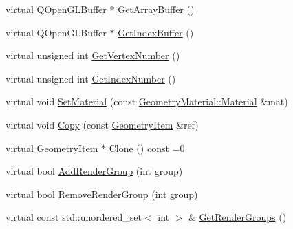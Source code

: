 \begin{DoxyCompactItemize}
\item 
virtual Q\+Open\+G\+L\+Buffer $\ast$ \mbox{\hyperlink{class_geometry_engine_1_1_geometry_world_item_1_1_geometry_item_1_1_geometry_item_a31eb19087cd7b37904df64fa5d01b754}{Get\+Array\+Buffer}} ()
\item 
virtual Q\+Open\+G\+L\+Buffer $\ast$ \mbox{\hyperlink{class_geometry_engine_1_1_geometry_world_item_1_1_geometry_item_1_1_geometry_item_af2d4cda419c8047f37643d88187da62f}{Get\+Index\+Buffer}} ()
\item 
virtual unsigned int \mbox{\hyperlink{class_geometry_engine_1_1_geometry_world_item_1_1_geometry_item_1_1_geometry_item_ae9d76b83de2b2dec2b19c77fdf49f853}{Get\+Vertex\+Number}} ()
\item 
virtual unsigned int \mbox{\hyperlink{class_geometry_engine_1_1_geometry_world_item_1_1_geometry_item_1_1_geometry_item_a3c9f379b23e9066340295056a6b4ca35}{Get\+Index\+Number}} ()
\item 
virtual void \mbox{\hyperlink{class_geometry_engine_1_1_geometry_world_item_1_1_geometry_item_1_1_geometry_item_a8156b3efd2c2d04ec8ae5ab60294189d}{Set\+Material}} (const \mbox{\hyperlink{class_geometry_engine_1_1_geometry_material_1_1_material}{Geometry\+Material\+::\+Material}} \&mat)
\item 
virtual void \mbox{\hyperlink{class_geometry_engine_1_1_geometry_world_item_1_1_geometry_item_1_1_geometry_item_a13a2a225acb39c559601c2151b4322bf}{Copy}} (const \mbox{\hyperlink{class_geometry_engine_1_1_geometry_world_item_1_1_geometry_item_1_1_geometry_item}{Geometry\+Item}} \&ref)
\item 
virtual \mbox{\hyperlink{class_geometry_engine_1_1_geometry_world_item_1_1_geometry_item_1_1_geometry_item}{Geometry\+Item}} $\ast$ \mbox{\hyperlink{class_geometry_engine_1_1_geometry_world_item_1_1_geometry_item_1_1_geometry_item_a1db8f97339ba49f746b3e0b4c4b02748}{Clone}} () const =0
\item 
virtual bool \mbox{\hyperlink{class_geometry_engine_1_1_geometry_world_item_1_1_geometry_item_1_1_geometry_item_adff9d0c0188f96abdbbec182ac1901d8}{Add\+Render\+Group}} (int group)
\item 
virtual bool \mbox{\hyperlink{class_geometry_engine_1_1_geometry_world_item_1_1_geometry_item_1_1_geometry_item_a7c2f338d13cf238060c10da51ee6dd14}{Remove\+Render\+Group}} (int group)
\item 
virtual const std\+::unordered\+\_\+set$<$ int $>$ \& \mbox{\hyperlink{class_geometry_engine_1_1_geometry_world_item_1_1_geometry_item_1_1_geometry_item_a573713d59a768141304466cce5ecf26e}{Get\+Render\+Groups}} ()

\end{DoxyCompactItemize}
